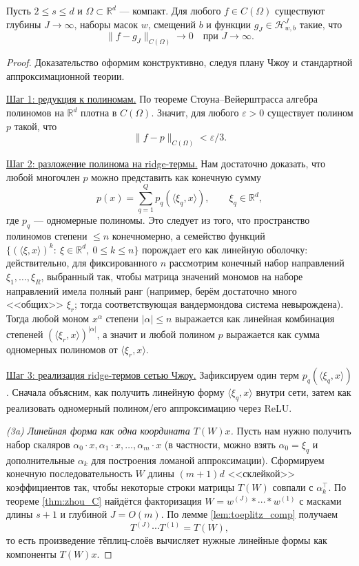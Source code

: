 \documentclass[../NDCNNAI_main.tex]{subfiles}
\begin{document}
\begin{theorem}
Пусть $2\le s\le d$ и $\Omega\subset\mathbb R^d$ --- компакт.
Для любого $f\in C(\Omega)$ существуют глубины $J\to\infty$, наборы масок $w$, смещений $b$ и функции
$g_J\in \mathcal H^{J}_{w,b}$ такие, что
\[
\|f-g_J\|_{C(\Omega)}\to 0\quad \text{при } J\to\infty.
\]  
\end{theorem}
\begin{proof}
Доказательство оформим конструктивно, следуя плану Чжоу и стандартной аппроксимационной теории.

\underline{Шаг 1: редукция к полиномам.}
По теореме Стоуна--Вейерштрасса алгебра полиномов на $\mathbb R^d$ плотна в $C(\Omega)$.
Значит, для любого $\varepsilon>0$ существует полином $p$ такой, что
\[
\|f-p\|_{C(\Omega)}<\varepsilon/3.
\]

\underline{Шаг 2: разложение полинома на ridge-термы.}
Нам достаточно доказать, что любой многочлен $p$ можно представить как конечную сумму
\[
p(x)=\sum_{q=1}^{Q} p_q(\langle \xi_q,x\rangle),
\qquad \xi_q\in\mathbb R^d,
\]
где $p_q$ --- одномерные полиномы.
Это следует из того, что пространство полиномов степени $\le n$ конечномерно,
а семейство функций $\{(\langle \xi,x\rangle)^k:\ \xi\in\mathbb R^d,\ 0\le k\le n\}$
порождает его как линейную оболочку: действительно, для фиксированного $n$ рассмотрим конечный набор направлений
$\xi_1,\dots,\xi_R$, выбранный так, чтобы матрица значений мономов на наборе направлений имела полный ранг
(например, берём достаточно много <<общих>> $\xi_r$; тогда соответствующая вандермондова система невырождена).
Тогда любой моном $x^\alpha$ степени $|\alpha|\le n$ выражается как линейная комбинация степеней
$(\langle \xi_r,x\rangle)^{|\alpha|}$, а значит и любой полином $p$ выражается как сумма одномерных полиномов от $\langle\xi_r,x\rangle$.

\underline{Шаг 3: реализация ridge-термов сетью Чжоу.}
Зафиксируем один терм $p_q(\langle\xi_q,x\rangle)$. Сначала объясним, как получить линейную форму $\langle\xi_q,x\rangle$
внутри сети, затем как реализовать одномерный полином/его аппроксимацию через ReLU.

\emph{(3a) Линейная форма как одна координата $T(W)x$.}
Пусть нам нужно получить набор скаляров $\alpha_0\cdot x,\alpha_1\cdot x,\dots,\alpha_m\cdot x$
(в частности, можно взять $\alpha_0=\xi_q$ и дополнительные $\alpha_k$ для построения ломаной аппроксимации).
Сформируем конечную последовательность $W$ длины $(m+1)d$ <<склейкой>> коэффициентов
так, чтобы некоторые строки матрицы $T(W)$ совпали с $\alpha_k^\top$.
По теореме \ref{thm:zhou_C} найдётся факторизация $W=w^{(J)}*\cdots*w^{(1)}$ с масками длины $s+1$ и глубиной $J=O(m)$.
По лемме \ref{lem:toeplitz_comp} получаем
\[
T^{(J)}\cdots T^{(1)}=T(W),
\]
то есть произведение тёплиц-слоёв вычисляет нужные линейные формы как компоненты $T(W)x$.


\end{proof}
\end{document}
